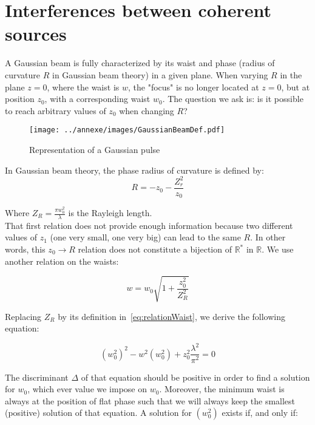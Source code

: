 \chapter{Interferences between coherent sources}
\label{ch:Investigation of a coherent source}





A Gaussian beam is fully characterized by its waist and phase (radius of curvature $R$ in Gaussian beam theory) in a given plane. When varying $R$ in the plane $z=0$, where the waist is $w$, the "focus" is no longer located at $z=0$, but at position $z_0$, with a corresponding waist $w_0$. The question we ask is: is it possible to reach arbitrary values of $z_0$ when changing $R$?

\begin{figure}[H]
\centering
\texttt{[image: ../annexe/images/GaussianBeamDef.pdf]}\\
\caption{\label{fig:GaussianBeamDef} Representation of a Gaussian pulse}
\end{figure}

\noindent In Gaussian beam theory, the phase radius of curvature is defined by:
$$
R = -z_0 - \frac{Z_r^2}{z_0}
$$

\noindent Where $Z_R = \frac{\pi w_0^2}{\lambda}$ is the Rayleigh length.\\

\noindent That first relation does not provide enough information because two different values of $z_1$ (one very small, one very big) can lead to the same $R$. In other words, this $z_0\rightarrow R$ relation does not constitute a bijection of $\mathbb{R}^*$ in $\mathbb{R}$. We use another relation on the waists:

\begin{equation}
\label{eq:relationWaist}
w =w_0\sqrt{1+\frac{z_0^2}{Z_R^2}}
\end{equation}


\noindent Replacing $Z_R$ by its definition in~\ref{eq:relationWaist}, we derive the following equation:

\begin{equation}
(w_{0}^2)^2 - w^2(w_{0}^2) + z_{0}^2\frac{\lambda^2}{\pi^2} =0
\end{equation}

\noindent The discriminant $\Delta$ of that equation should be positive in order to find a solution for $w_0$, which ever value we impose on $w_0$. Moreover, the minimum waist is always at the position of flat phase such that we will always keep the smallest (positive) solution of that equation. A solution for $(w_0^2)$ exists if, and only if:

